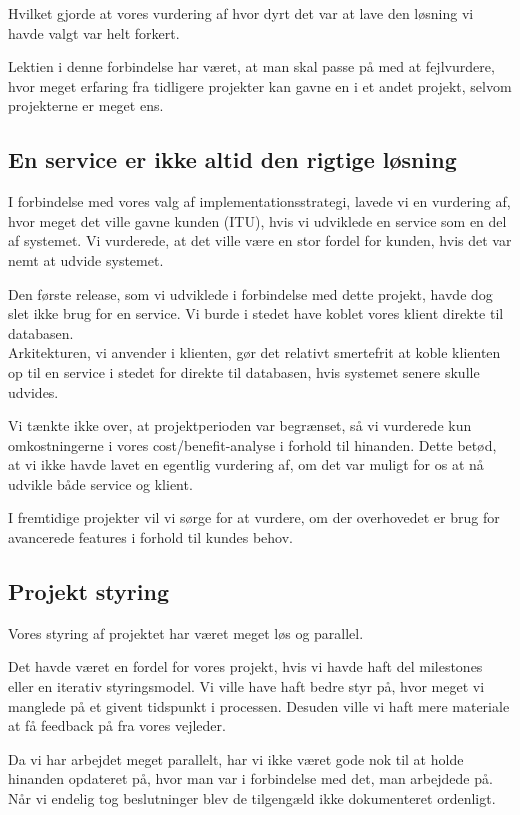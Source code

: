 Hvilket gjorde at vores vurdering af hvor dyrt det var at lave den løsning vi havde valgt var helt forkert.

Lektien i denne forbindelse har været, at man skal passe på med at fejlvurdere, hvor meget erfaring fra tidligere projekter kan gavne en i et andet projekt, selvom projekterne er meget ens.

\subsection{En service er ikke altid den rigtige løsning}
\label{Conclusion_Lessons_Service}
I forbindelse med vores valg af implementationsstrategi, lavede vi en vurdering af, hvor meget det ville gavne kunden (ITU), hvis vi udviklede en service som en del af systemet. Vi vurderede, at det ville være en stor fordel for kunden, hvis det var nemt at udvide systemet.

Den første release, som vi udviklede i forbindelse med dette projekt, havde dog slet ikke brug for en service. Vi burde i stedet have koblet vores klient direkte til databasen. 
\\Arkitekturen, vi anvender i klienten, gør det relativt smertefrit at koble klienten op til en service i stedet for direkte til databasen, hvis systemet senere skulle udvides.

Vi tænkte ikke over, at projektperioden var begrænset, så vi vurderede kun omkostningerne i vores cost/benefit-analyse i forhold til hinanden. Dette betød, at vi ikke havde lavet en egentlig vurdering af, om det var muligt for os at nå udvikle både service og klient.

I fremtidige projekter vil vi sørge for at vurdere, om der overhovedet er brug for avancerede features i forhold til kundes behov.

\subsection{Projekt styring}
\label{Conclusion_Lessons_Styring}
Vores styring af projektet har været meget løs og parallel. 

Det havde været en fordel for vores projekt, hvis vi havde haft del milestones eller en iterativ styringsmodel. Vi ville have haft bedre styr på, hvor meget vi manglede på et givent tidspunkt i processen. Desuden ville vi haft mere materiale at få feedback på fra vores vejleder.

Da vi har arbejdet meget parallelt, har vi ikke været gode nok til at holde hinanden opdateret på, hvor man var i forbindelse med det, man arbejdede på. Når vi endelig tog beslutninger blev de tilgengæld ikke dokumenteret ordenligt.

